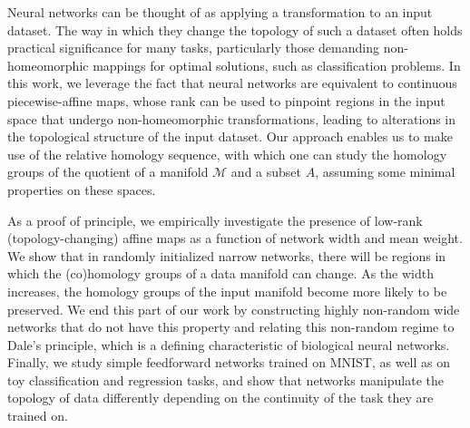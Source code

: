 Neural networks can be thought of as applying a transformation to an input dataset. The way in which they change the topology of such a dataset often holds practical significance for many tasks, particularly those demanding non-homeomorphic mappings for optimal solutions, such as classification problems. In this work, we leverage the fact that neural networks are equivalent to continuous piecewise-affine maps, whose rank can be used to pinpoint regions in the input space that undergo non-homeomorphic transformations, leading to alterations in the topological structure of the input dataset. Our approach enables us to make use of the relative homology sequence, with which one can study the homology groups of the quotient of a manifold $\mathcal{M}$ and a subset $A$, assuming some minimal properties on these spaces. 
    
    As a proof of principle, we empirically investigate the presence of low-rank (topology-changing) affine maps as a function of network width and mean weight. We show that in randomly initialized narrow networks, there will be regions in which the (co)homology groups of a data manifold can change. As the width increases, the homology groups of the input manifold become more likely to be preserved. We end this part of our work by constructing highly non-random wide networks that do not have this property and relating this non-random regime to Dale's principle, which is a defining characteristic of biological neural networks.
    Finally, we study simple feedforward networks trained on MNIST, as well as on toy classification and regression tasks, and show that networks manipulate the topology of data differently depending on the continuity of the task they are trained on.